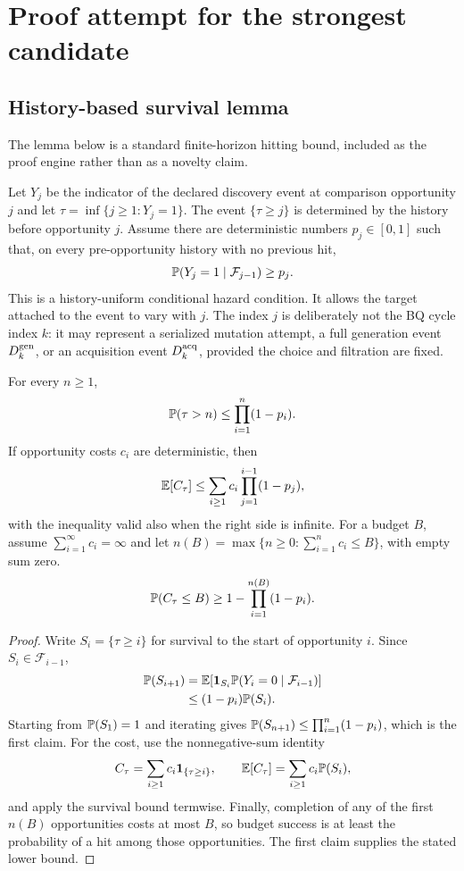 \section{Proof attempt for the strongest candidate}

\subsection{History-based survival lemma}
   The lemma below is
a standard finite-horizon hitting bound,
included as the proof engine rather than as a novelty claim.

Let $Y_j$ be the indicator of the declared discovery event at comparison
opportunity $j$ and let $\tau=\inf\{j\geq1:Y_j=1\}$. The event
$\{\tau\geq j\}$ is determined by the history before opportunity $j$.
Assume there are deterministic numbers $p_j\in[0,1]$ such that, on every
pre-opportunity history with no previous hit,
\[
 \mathbb{P}(Y_j=1\mid\mathcal{F}_{j-1})\geq p_j.
\]
This is a history-uniform conditional hazard condition. It allows the target
attached to the event to vary with $j$. The index $j$ is deliberately not the
BQ cycle index $k$: it may represent a serialized mutation attempt, a full
generation event $D_k^{\rm gen}$, or an acquisition event
$D_k^{\rm acq}$, provided the choice and filtration are fixed.

\begin{lemma}
For every $n\geq1$,
\[
 \mathbb{P}(\tau>n)\leq\prod_{i=1}^{n}(1-p_i).
\]
If opportunity costs $c_i$ are deterministic, then
\[
 \mathbb{E}[C_\tau]
 \leq \sum_{i\geq1}c_i\prod_{j=1}^{i-1}(1-p_j),
\]
with the inequality valid also when the right side is infinite. For a budget $B$, assume
$\sum_{i=1}^\infty c_i=\infty$ and let
$n(B)=\max\{n\geq0: \sum_{i=1}^{n}c_i\leq B\}$, with empty sum zero.
\[
 \mathbb{P}(C_\tau\leq B)\geq
 1-\prod_{i=1}^{n(B)}(1-p_i).
\]
\end{lemma}

\begin{proof}
Write $S_i=\{\tau\geq i\}$ for survival to the start of opportunity $i$.
Since $S_i\in\mathcal{F}_{i-1}$,
\begin{align*}
 \mathbb{P}(S_{i+1})
 &=\mathbb{E}\!\left[\mathbf{1}_{S_i}
       \mathbb{P}(Y_i=0\mid\mathcal{F}_{i-1})\right] \\
 &\leq (1-p_i)\mathbb{P}(S_i).
\end{align*}
Starting from $\mathbb{P}(S_1)=1$ and iterating gives
$\mathbb{P}(S_{n+1})\leq\prod_{i=1}^{n}(1-p_i)$, which is the first claim.
For the cost, use the nonnegative-sum identity
\[
 C_\tau=\sum_{i\geq1}c_i\mathbf{1}_{\{\tau\geq i\}},
 \qquad
 \mathbb{E}[C_\tau]=\sum_{i\geq1}c_i\mathbb{P}(S_i),
\]
and apply the survival bound termwise. Finally, completion of any of the
first $n(B)$ opportunities costs at most $B$, so budget success is at least the
probability of a hit among those opportunities. The first claim supplies the
stated lower bound.
\end{proof}

